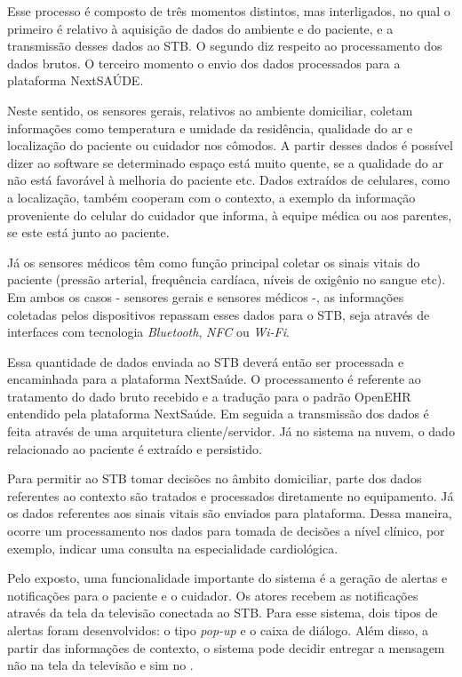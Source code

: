 
Esse processo é composto de três momentos distintos, mas  interligados, no qual
o primeiro é relativo à aquisição de dados do ambiente e do paciente, e a
transmissão desses dados ao STB. O segundo diz respeito ao processamento dos
dados brutos. O terceiro momento o envio dos dados processados para a plataforma
NextSAÚDE.

Neste sentido, os sensores gerais, relativos ao ambiente domiciliar, coletam
informações como  temperatura e umidade da residência, qualidade do ar e
localização do paciente ou cuidador nos cômodos. A partir desses dados é
possível dizer ao software se determinado espaço está muito quente, se a
qualidade do ar não está favorável à melhoria do paciente etc. Dados extraídos
de celulares, como a localização, também cooperam com o contexto, a exemplo da
informação proveniente do celular do cuidador que informa, à equipe médica ou
aos parentes, se este está junto ao paciente.

Já os sensores médicos têm como função principal coletar os sinais vitais do
paciente (pressão arterial, frequência cardíaca, níveis de oxigênio no sangue
etc). Em ambos os casos - sensores gerais e sensores médicos -, as informações
coletadas pelos dispositivos repassam  esses dados para o STB, seja através de
interfaces com tecnologia  \textit{Bluetooth}, \textit{NFC} ou \textit{Wi-Fi}.

Essa quantidade de dados enviada ao STB deverá então ser processada e encaminhada
para a plataforma NextSaúde. O processamento é referente ao tratamento do dado
bruto recebido e a tradução para o padrão OpenEHR entendido pela plataforma
NextSaúde. Em seguida a transmissão dos dados é feita através de uma
arquitetura  cliente/servidor. Já no sistema na nuvem, o dado relacionado ao
paciente é extraído e persistido.

Para permitir ao STB tomar decisões no âmbito domiciliar, parte dos dados
referentes ao contexto são tratados e processados diretamente no equipamento.
Já os dados referentes aos sinais vitais são enviados para plataforma. Dessa 
maneira, ocorre um processamento nos dados para tomada de decisões a nível
clínico, por exemplo, indicar uma consulta na especialidade cardiológica.

Pelo exposto, uma funcionalidade importante do sistema é a geração de alertas e
notificações para o paciente e o cuidador. Os atores recebem as notificações
através da tela da televisão conectada ao STB. Para esse sistema, dois tipos de
alertas foram desenvolvidos: o tipo \textit{pop-up} e o caixa de diálogo.
Além disso, a partir das informações de contexto, o sistema pode decidir
entregar a mensagem não na tela da televisão e sim no \smartphone.

